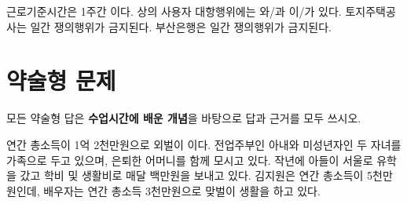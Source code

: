 \documentclass[11pt,]{exam} %
\begin{document}
\begin{questions}
 근로기준시간은 1주간 \fillin[40시간]{}이다.
 상의 사용자 대항행위에는 \fillin[직장폐쇄]{}와/과 \fillin[조업계속]{} 이/가 있다.
 토지주택공사는 \fillin[10]{}일간 쟁의행위가 금지된다. 부산은행은 \fillin[15]{}일간 쟁의행위가 금지된다.

\pagebreak

\section*{약술형 문제}
모든 약술형 답은 \textbf{수업시간에 배운 개념}을 바탕으로 답과 근거를 모두 쓰시오.

 연간 총소득이 1억 2천만원으로 외벌이 이다. 전업주부인 아내와 미성년자인 두 자녀를 가족으로 두고 있으며, 은퇴한 어머니를 함께 모시고 있다. 작년에 아들이 서울로 유학을 갔고 학비 및 생활비로 매달 백만원을 보내고 있다. 김지원은 연간 총소득이 5천만원인데, 배우자는 연간 총소득 3천만원으로 맞벌이 생활을 하고 있다.
\end{questions}
\end{document}
